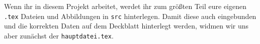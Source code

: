 Wenn ihr in diesem Projekt arbeitet, werdet ihr zum größten Teil eure eigenen
\texttt{.tex} Dateien und Abbildungen in \texttt{src} hinterlegen. Damit diese
auch eingebunden und die korrekten Daten auf dem Deckblatt hinterlegt werden,
widmen wir uns aber zunächst der \texttt{hauptdatei.tex}.

